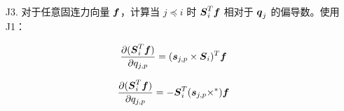 \documentclass[letterpaper, 10 pt, conference]{ieeetran}  %
\begin{document}
{\begin{enumerate}
通过交换符号，方程(\ref{dv_eq2})也可写为：

\begin{equation}
    \frac{\partial \v_{i}}{\partial q_{j,p}} = - \sum_{j \preceq l \preceq i} \Phibar_{l} \qd_{l}  \times \phibar_{j,p}
\label{dv_eq3}
\end{equation}

方程(\ref{dv_eq3})可写为，对于关节 $j$ 的每个第 $p$ 模式，获得 $\v_{i}$ 相对于 $\q_{j}$ 的偏导数(大小为 $6 \times n_{j}$，其中 $n_j$ 是关节 $j$ 的自由度数量)，即为：

\begin{equation}
    \frac{\partial \v_{i}}{\partial \q_{j}} = - \sum_{j \preceq l \preceq i} \Phibar_{l} \qd_{l}  \times \Phibar_{j}
\label{dv_eq4}
\end{equation}
使用 $\v_{l}$的定义，方程(\ref{dv_eq4})现在是：

\begin{equation}
    \frac{\partial \v_{i}}{\partial \q_{j}} = (\v_{\lambda(j)} - \v_{i})  \times \Phibar_{j}
\label{dvi_dqj_iden}
\end{equation}

使用方程(\ref{dvi_dqj_iden})，对于 $j \preceq i$，$\v_{i} \times \a$ 相对于 $\q_j$ 的偏导数，其中 $\a \in M^{6}$ 是任意固连运动向量，给出为：


\begin{equation}
    \frac{\partial (\v_{i} \times \a)}{\partial \q_{j}} = -\a \times \Big( (\v_{\lambda(j)} - \v_{i})  \times \Phibar_{j}  \Big)
\label{dva_eq1}
\end{equation}

类似于方程(\ref{dva_eq1})，$\v_{i} \times^{*} \f$ 的偏导数，其中 $\f \in F^{6}$ 是任意固连力向量，被计算为：

\begin{equation}
   \frac{\partial (\v_{i} \times^{*} \f)}{\partial \q_{j}} = \f \crff \Big( (\v_{\lambda(j)} - \v_{i})  \times \Phibar_{j}  \Big)
\label{dvcrossstara_eq1}   
\end{equation}


\item[J3.] 对于任意固连力向量 $\boldsymbol{f}$，计算当 $j \preceq i$ 时 $\boldsymbol{S}_{i}^{T} \boldsymbol{f}$ 相对于 $\q_j$ 的偏导数。使用 J1：

\begin{equation}
 \frac{\partial (\Phibar_{i}^{T} \f)}{\partial q_{j,p}} =  (\phibar_{j,p} \times \Phibar_{i})^{T} \f 
 \label{dphif_eq1}
\end{equation}

\begin{equation}
 \frac{\partial (\Phibar_{i}^{T} \f)}{\partial q_{j,p}} = - \Phibar_{i}^{T} (\phibar_{j,p} \times^{*} ) \f 
 \label{dphif_eq2}
\end{equation}


\end{enumerate}}
\end{document}

